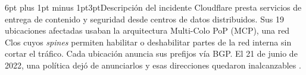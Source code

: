 \documentclass[10pt,a4paper]{article}
\renewcommand{\arraystretch}{1.15}
\begin{document}
\begingroup
\setlength{\headwidth}{\textwidth}
\makeatletter
\renewcommand{\section}{\@startsection{section}{1}{\z@}%
  {6pt plus 1pt minus 1pt}{3pt}{\normalfont\large\bfseries}}
\renewcommand{\paragraph}{\@startsection{paragraph}{4}{\z@}%
  {3pt plus 0.5pt}{-0.65em}{\normalfont\normalsize\bfseries}}
\makeatother
\fontsize{10}{11.6}\selectfont
\setlength{\parskip}{2pt}
\renewcommand{\arraystretch}{1.04}
\newenvironment{bloquecentrado}{\par\smallskip\centering}{\par\smallskip}
\captionsetup{font=footnotesize,skip=2pt}
\section{Descripción del incidente}
Cloudflare presta servicios de entrega de contenido y seguridad desde centros de datos distribuidos. Sus 19 ubicaciones afectadas usaban la arquitectura Multi-Colo PoP (MCP), una red Clos cuyos \emph{spines} permiten habilitar o deshabilitar partes de la red interna sin cortar el tráfico. Cada ubicación anuncia sus prefijos vía BGP. El 21 de junio de 2022, una política dejó de anunciarlos y esas direcciones quedaron inalcanzables \cite{cloudflare2022}.
\end{document}
